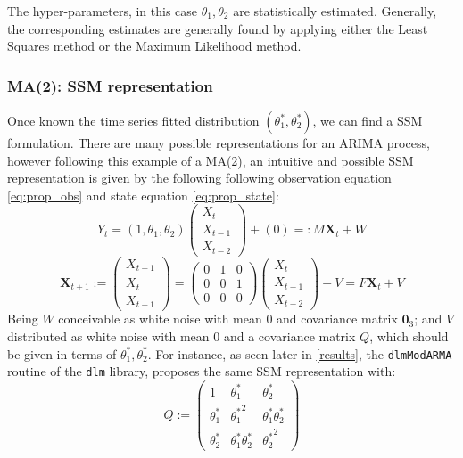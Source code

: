 \documentclass{article}
\theoremstyle{definition}
\theoremstyle{definition}
\theoremstyle{remark}
\theoremstyle{mythmstyle}
\begin{document}
The hyper-parameters, in this case $\theta_1, \theta_2$ are statistically estimated. Generally, the corresponding estimates are generally found by applying either the Least Squares method or the Maximum Likelihood method.

\subsubsection{MA(2): SSM representation}\label{ma2_ssm}

Once known the time series fitted distribution $(\theta_1^*, \theta_2^*)$, we can find a SSM formulation. There are many possible representations for an ARIMA process, however following this example of a MA(2), an intuitive and possible SSM representation is given by the following following observation equation \ref{eq:prop_obs} and state equation \ref{eq:prop_state}:
\begin{equation}\label{eq:prop_obs}
     Y_t = ( 1, \theta_1, \theta_2) \begin{pmatrix}
    X_{t} \\ X_{t-1} \\ X_{t-2}
    \end{pmatrix} + (0) =: M \mathbf{X}_t + W   
 \end{equation} \begin{equation}\label{eq:prop_state}
     \bm{X}_{t+1} := \begin{pmatrix}
     X_{t+1} \\ X_{t} \\ X_{t-1}
     \end{pmatrix} = \begin{pmatrix}
      0 & 1 & 0 \\ 0 & 0  & 1 \\ 0 & 0 & 0 
     \end{pmatrix}
     \begin{pmatrix}
     X_{t} \\ X_{t-1} \\ X_{t-2}
     \end{pmatrix} + V = F \mathbf{X}_t + V
 \end{equation}
Being $W$ conceivable as white noise with mean 0 and covariance matrix $\mathbf{0}_{3}$; and $V$ distributed as white noise with mean 0 and a covariance matrix $Q$, which should be given in terms of $\theta_1^*, \theta_2^*$. For instance, as seen later in \ref{results}, the \texttt{dlmModARMA} routine of the \texttt{dlm} library, proposes the same SSM representation with:
\begin{equation}
    Q := \begin{pmatrix}
         1 & \theta_1^* & \theta_2^* \\
      \theta_1^* & {\theta_1^*}^2 & \theta_1^* \theta_2^* \\ 
      \theta_2^* & \theta_1^* \theta_2^* & {\theta_2^*}^2
     \end{pmatrix}
\end{equation}
\end{document}
